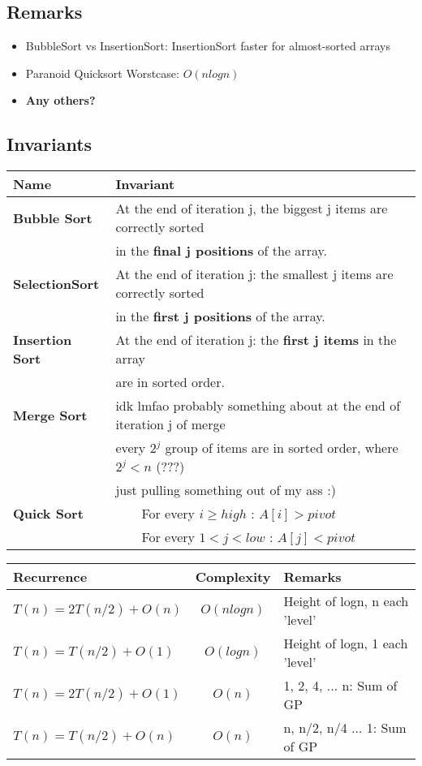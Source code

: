 \documentclass{article}
\newcommand{\tabitem}{~~\llap{\textbullet}~~}
\begin{document}
    \subsection{Remarks}
    \begin{itemize}
        \item BubbleSort vs InsertionSort: InsertionSort faster for almost-sorted arrays
        \item Paranoid Quicksort Worstcase: $O(nlogn)$
        \item \textbf{Any others?}
    \end{itemize}

    \subsection{Invariants}
    \begin{tabular}{|l||l|}
        \toprule
        \textbf{Name} & \textbf{Invariant}\\
        \midrule
        \midrule
        \textbf{Bubble Sort} &  At the end of iteration j, the biggest j items are correctly sorted \\
        & in the \textbf{final j positions} of the array.\\
        \hline
        \textbf{SelectionSort} & At the end of iteration j: the smallest j items are correctly sorted \\
        & in the \textbf{first j positions} of the array.\\
        \hline
        \textbf{Insertion Sort} & At the end of iteration j: the \textbf{first j items} in the array \\
        &  are in sorted order.\\
        \hline
        \textbf{Merge Sort} & idk lmfao probably something about at the end of iteration j of merge\\
        & every $2^{j}$ group of items are in sorted order, where $2^{j} < n$ (???)\\
        & just pulling something out of my ass :)\\ 
        \hline
        \textbf{Quick Sort} & \tabitem For every $i \geq high$ : $A[i] > pivot$\\
        & \tabitem For every $1 < j < low$ : $A[j] < pivot$\\
        \bottomrule
    \end{tabular}


    \begin{tabular}{|l|c|l|}
        \toprule
        \textbf{Recurrence} & \textbf{Complexity} & \textbf{Remarks}\\
        \toprule
        $T(n) = 2T(n/2) + O(n)$ & $O(nlogn)$ & Height of logn, n each 'level'\\
        \midrule
        $T(n) = T(n / 2) + O(1)$ & $O(logn)$ & Height of logn, 1 each 'level'\\
        \midrule
        $T(n) = 2T(n / 2) + O(1)$ & $O(n)$ & 1, 2, 4, ... n: Sum of GP\\
        \midrule
        $T(n) = T(n / 2) + O(n)$ & $O(n)$ & n, n/2, n/4 ... 1: Sum of GP\\ 
        \bottomrule
    \end{tabular}
\end{document}
